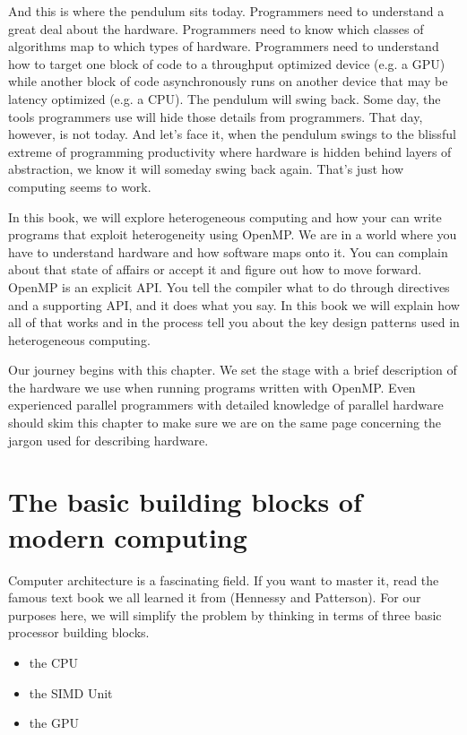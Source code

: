 And this is where the pendulum sits today.   Programmers need to understand a great deal about the hardware.  Programmers need to 
know which classes of algorithms map to which types of hardware.  Programmers need to understand how to target one block of 
code to a throughput optimized device (e.g. a GPU) while another block of code asynchronously runs on another device
that may be latency optimized (e.g. a CPU).  The pendulum will swing back.  Some day, the tools programmers use will 
hide those details from programmers.   That day, however, is not today.   And let's face it, when the pendulum swings to the
blissful extreme of programming productivity where hardware is hidden behind layers of abstraction, we know it will someday
swing back again.  That's just how computing seems to work.

In this book, we will explore heterogeneous computing and how your can write programs that exploit heterogeneity 
using OpenMP.  We are in a world where you have to understand hardware and how software maps onto it.   You can 
complain about that state of affairs or accept it and figure out how to move forward.  OpenMP is an explicit API.  You 
tell the compiler what to do through directives and a supporting API, and it does what you say.    In this book we will
explain how all of that works and in the process tell you about the key design patterns used in heterogeneous computing.

Our journey begins with this chapter.  We set the stage with a brief description of the hardware we use when
running programs written with OpenMP.   Even experienced parallel programmers with detailed knowledge of
parallel hardware should skim this chapter to make sure we are on the same page concerning the jargon used
for describing hardware.

\section{The basic building blocks of modern computing}

Computer architecture is a fascinating field. If you want to master it, read the
famous text book we all learned it from (Hennessy and Patterson).  For our purposes
here, we will simplify the problem by thinking in terms of three basic processor building blocks.

\begin{itemize}
\item  the CPU
\item  the SIMD Unit
\item  the GPU
\end{itemize}

